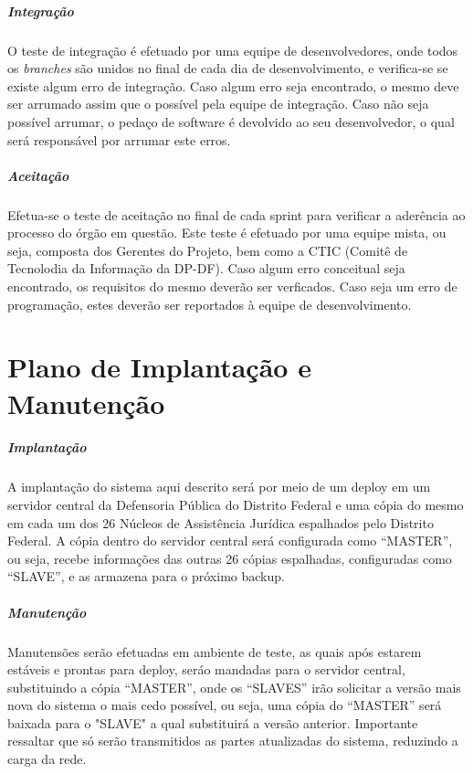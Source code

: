 \documentclass[12pt,a4paper]{report}
\begin{document}
\paragraph{Integração} O teste de integração é efetuado por uma equipe de desenvolvedores, onde todos os \textit{branches} são unidos no final de cada dia de desenvolvimento, e verifica-se se existe algum erro de integração. Caso algum erro seja encontrado, o mesmo deve ser arrumado assim que o possível pela equipe de integração. Caso não seja possível arrumar, o pedaço de software é devolvido ao seu desenvolvedor, o qual será responsável por arrumar este erros.

\paragraph{Aceitação} Efetua-se o teste de aceitação no final de cada sprint para verificar a aderência ao processo do órgão em questão. Este teste é efetuado por uma equipe mista, ou seja, composta dos Gerentes do Projeto, bem como a CTIC (Comitê de Tecnolodia da Informação da DP-DF). Caso algum erro conceitual seja encontrado, os requisitos do mesmo deverão ser verficados. Caso seja um erro de programação, estes deverão ser reportados à equipe de desenvolvimento.

\chapter{Plano de Implantação e Manutenção}
\paragraph{Implantação} A implantação do sistema aqui descrito será por meio de um deploy em um servidor central da Defensoria Pública do Distrito Federal e uma cópia do mesmo em cada um dos 26 Núcleos de Assistência Jurídica espalhados pelo Distrito Federal. A cópia dentro do servidor central será configurada como ``MASTER'', ou seja, recebe informações das outras 26 cópias espalhadas, configuradas como ``SLAVE'', e as armazena para o próximo backup.

\paragraph{Manutenção} Manutensões serão efetuadas em ambiente de teste, as quais após estarem estáveis e prontas para deploy, seráo mandadas para o servidor central, substituindo a cópia ``MASTER'', onde os ``SLAVES'' irão solicitar a versão mais nova do sistema o mais cedo possível, ou seja, uma cópia do ``MASTER'' será baixada para o "SLAVE" a qual substituirá a versão anterior. Importante ressaltar que só serão transmitidos as partes atualizadas do sistema, reduzindo a carga da rede.
\end{document}
